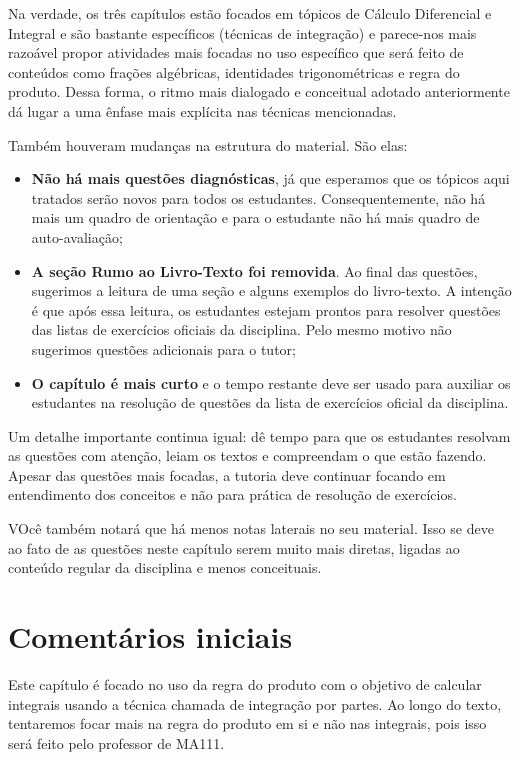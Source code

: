\documentclass[main_estudante.tex]{subfiles}
\begin{document}
Na verdade, os três capítulos estão focados em tópicos de Cálculo Diferencial e Integral e são bastante específicos (técnicas de integração) e parece-nos mais razoável propor atividades mais focadas no uso específico que será feito de conteúdos como frações algébricas, identidades trigonométricas e regra do produto. Dessa forma, o ritmo mais dialogado e conceitual adotado anteriormente dá lugar a uma ênfase mais explícita nas técnicas mencionadas.

Também houveram mudanças na estrutura do material. São elas:

\begin{itemize}
 \item \textbf{Não há mais questões diagnósticas}, já que esperamos que os tópicos aqui tratados serão novos para todos os estudantes. Consequentemente, não há mais um quadro de orientação e para o estudante não há mais quadro de auto-avaliação;
 \item \textbf{A seção Rumo ao Livro-Texto foi removida}. Ao final das questões, sugerimos a leitura de uma seção e alguns exemplos do livro-texto. A intenção é que após essa leitura, os estudantes estejam prontos para resolver questões das listas de exercícios oficiais da disciplina. Pelo mesmo motivo não sugerimos questões adicionais para o tutor;
 \item \textbf{O capítulo é mais curto} e o tempo restante deve ser usado para auxiliar os estudantes na resolução de questões da lista de exercícios oficial da disciplina.
\end{itemize}

Um detalhe importante continua igual: dê tempo para que os estudantes resolvam as questões com atenção, leiam os textos e compreendam o que estão fazendo. Apesar das questões mais focadas, a tutoria deve continuar focando em entendimento dos conceitos e não para prática de resolução de exercícios.

VOcê também notará que há menos notas laterais no seu material. Isso se deve ao fato de as questões neste capítulo serem muito mais diretas, ligadas ao conteúdo regular da disciplina e menos conceituais.

\section{Comentários iniciais}

Este capítulo é focado no uso da regra do produto com o objetivo de calcular integrais usando a técnica chamada de integração por partes. Ao longo do texto, tentaremos focar mais na regra do produto em si e não nas integrais, pois isso será feito pelo professor de MA111.
\end{document}
